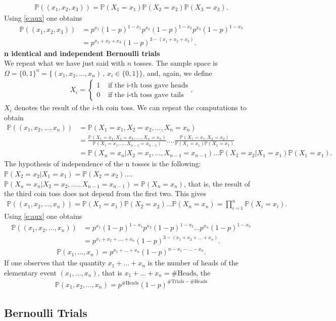 \documentclass[12pt]{article}
\newcommand{\<}{{\langle \!\! \langle}}
\renewcommand{\>}{{\rangle \!\! \rangle}}
\newcommand{\bel}[2]{\begin{equation} \label{#1} \begin{split} #2
 					\end{split} \end{equation}}
\begin{document}
\bel{}{\mathbb{P}((x_1,x_2,x_3))=\mathbb{P}(X_1=x_1)\mathbb{P}(X_2=x_2)\mathbb{P}(X_3=x_3).}
Using \eqref{e:aux} one obtains 
\bel{}{\mathbb{P}((x_1,x_2,x_3)) & =p^{x_1}(1-p)^{1-x_1}p^{x_2}(1-p)^{1-x_2}p^{x_3}(1-p)^{1-x_3} \\ &=p^{x_1+x_2+x_3}(1-p)^{3-(x_1+x_2+x_3)}.}
\textbf{n identical and independent Bernoulli trials}\\
We repeat what we have just said with $n$ tosses. The sample space is $\Omega=\{0,1\}^n=\{(x_1,x_2,...,x_n)\,,\,x_i\in\{0,1\}\}$, and, again, we define
\bel{}{X_i=\begin{cases}
1 & \textrm{ if the i-th toss gave heads}\\
0 & \textrm{ if the i-th toss gave tails}
\end{cases}.}
$X_i$ denotes the result of the $i$-th coin toss. We can repeat the computations to obtain
\bel{e:chain}{\mathbb{P}((x_1,x_2,...,x_n)) &=\mathbb{P}(X_1=x_1,X_2=x_2,...,X_n=x_n) \\
& = \frac{\mathbb{P}(X_1=x_1,X_2=x_2,....,X_n=x_n)}{\mathbb{P}(X_1=x_1,...,X_{n-1}=x_{n-1})}....\frac{\mathbb{P}(X_1=x_1,X_2=x_2)}{\mathbb{P}(X_1=x_1)\mathbb{P}(X_1=x_1)} \\ & =\mathbb{P}(X_n=x_n|X_2=x_1,...,X_{n-1}=x_{n-1})...\mathbb{P}(X_2=x_2|X_1=x_1)\mathbb{P}(X_1=x_1).}
The hypothesis of independence of the n tosses is the following:
$\mathbb{P}(X_2=x_2|X_1=x_1)=\mathbb{P}(X_2=x_2)$.... $\mathbb{P}(X_n=x_n|X_2=x_2,....,X_{n-1}=x_{n-1})=\mathbb{P}(X_n=x_n)$, that is, the result of the third coin toss does not depend from the first two. This gives 
\bel{e:indbern}{\mathbb{P}((x_1,x_2,...,x_n))=\mathbb{P}(X_1=x_1)\mathbb{P}(X_2=x_2)...\mathbb{P}(X_n=x_n)=\prod_{i=1}^n\mathbb{P}(X_i=x_i).}
Using \eqref{e:aux} one obtains 
\bel{}{\mathbb{P}((x_1,x_2,...,x_n)) & =p^{x_1}(1-p)^{1-x_1}p^{x_2}(1-p)^{1-x_2}...p^{x_n}(1-p)^{1-x_n} \\ &=p^{x_1+x_2+....+x_n}(1-p)^{3-(x_1+x_2+...+x_n)}.}
\bel{e:bernoulli}{\mathbb{P}(x_1,...,x_n)=p^{x_1+...+x_n}(1-p)^{n-x_1-...-x_n}.}
If one observes that the quantity $x_1+...+x_n$ is the number of heads of the elementary event $(x_1,...,x_n)$, that is $x_1+...+x_n=\#\textrm{Heads}$, the
\bel{}{\mathbb{P}(x_1,x_2,...,x_n)=p^{\#\textrm{Heads}}(1-p)^{\#\textrm{Trials}-\#\textrm{Heads}}}

\subsection{Bernoulli Trials}
\end{document}
